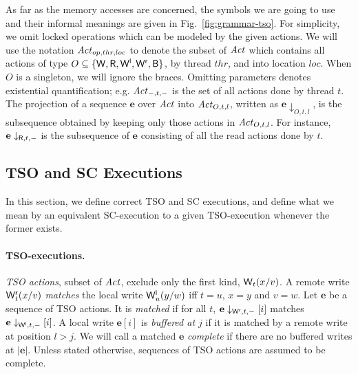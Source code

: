 As far as the memory accesses are concerned, the symbols we are going to use and their informal meanings are given in Fig.~\ref{fig:grammar-tso}.
For simplicity, we omit locked operations which can be modeled by the given actions.
We will use the notation $\mathit{Act}_{op,thr,loc}$ to denote the subset of $\mathit{Act}$ which contains all actions of type $O\subseteq\{\mathsf{W}, \mathsf{R}, \mathsf{W}^{\mathsf{l}}, \mathsf{W}^{\mathsf{r}}, \mathsf{B}\}$, by thread $thr$, and into location $loc$.
When $O$ is a singleton, we will ignore the braces.
Omitting parameters denotes existential quantification; e.g. $\mathit{Act}_{-,t,-}$ is the set of all actions done by thread $t$.
The projection of a sequence $\mathbf{e}$ over $\mathit{Act}$ into $\mathit{Act}_{O,t,l}$, written as $\mathbf{e}\downarrow_{O,t,l}$, is the subsequence obtained by keeping only those actions in $\mathit{Act}_{O,t,l}$.
For instance, $\mathbf{e}\downarrow_{\mathsf{R},t,-}$ is the subsequence of $\mathbf{e}$ consisting of all the read actions done by $t$.

\subsection{TSO and SC Executions}
\label{subsec:tso-sc-semantics}
In this section, we define correct TSO and SC executions, and define what we mean by an equivalent SC-execution to a given TSO-execution whenever the former exists.

\paragraph{TSO-executions.}
{\em TSO actions}, subset of $\mathit{Act}$, exclude only the first kind, $\mathsf{W}_{t}(x/v)$.
A remote write $\mathsf{W}^{\mathsf{r}}_{t}(x/v)$ {\em matches} the local write $\mathsf{W}^{\mathsf{l}}_{u}(y/w)$ iff $t=u$, $x=y$ and $v=w$.
Let $\mathbf{e}$ be a sequence of TSO actions.
It is {\em matched} if for all $t$, $\mathbf{e}\downarrow_{\mathsf{W}^{\mathsf{r}},t,-}[i]$ matches $\mathbf{e}\downarrow_{\mathsf{W}^{\mathsf{l}},t,-}[i]$.
A local write $\mathbf{e}[i]$ is {\em buffered at $j$} if it is matched by a remote write at position $l>j$.
We will call a matched $\mathbf{e}$ {\em complete} if there are no buffered writes at $|\mathbf{e}|$.
Unless stated otherwise, sequences of TSO actions are assumed to be complete.


